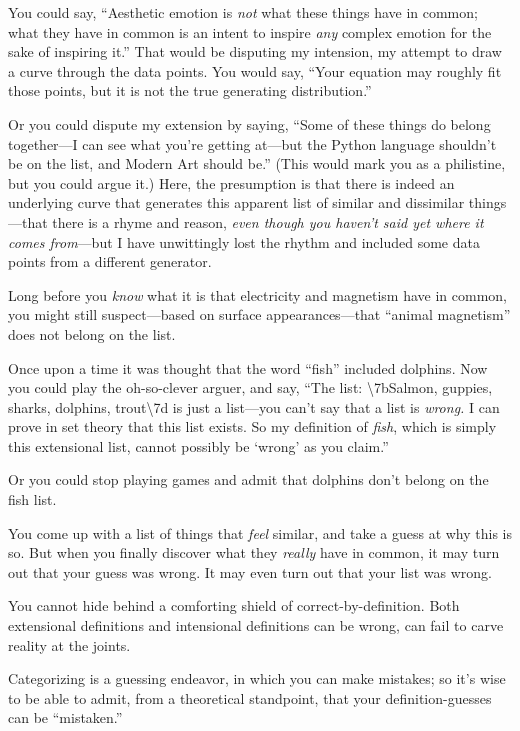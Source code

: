 {
 You could say, ``Aesthetic emotion is
\textit{not} what these things have in common; what they have in common
is an intent to inspire \textit{any} complex emotion for the sake of
inspiring it.'' That would be disputing my intension,
my attempt to draw a curve through the data points. You would say,
``Your equation may roughly fit those points, but it
is not the true generating distribution.''}

{
 Or you could dispute my extension by saying,
``Some of these things do belong together---I can see
what you're getting at---but the Python language
shouldn't be on the list, and Modern Art should
be.'' (This would mark you as a philistine, but you
could argue it.) Here, the presumption is that there is indeed an
underlying curve that generates this apparent list of similar and
dissimilar things---that there is a rhyme and reason, \textit{even
though you haven't said yet where it comes
from}{}---but I have unwittingly lost the rhythm and included some data
points from a different generator.}

{
 Long before you \textit{know} what it is that electricity and
magnetism have in common, you might still suspect---based on surface
appearances---that ``animal
magnetism'' does not belong on the list.}

{
 Once upon a time it was thought that the word
``fish'' included dolphins. Now you
could play the oh-so-clever arguer, and say, ``The
list: {\textbackslash}{\textquotesingle}7bSalmon, guppies, sharks,
dolphins, trout{\textbackslash}{\textquotesingle}7d is just a
list---you can't say that a list is \textit{wrong.} I
can prove in set theory that this list exists. So my definition of
\textit{fish}, which is simply this extensional list, cannot possibly
be `wrong' as you
claim.''}

{
 Or you could stop playing games and admit that dolphins
don't belong on the fish list.}

{
 You come up with a list of things that \textit{feel} similar, and
take a guess at why this is so. But when you finally discover what they
\textit{really} have in common, it may turn out that your guess was
wrong. It may even turn out that your list was wrong.}

{
 You cannot hide behind a comforting shield of
correct-by-definition. Both extensional definitions and intensional
definitions can be wrong, can fail to carve reality at the joints.}

{
 Categorizing is a guessing endeavor, in which you can make
mistakes; so it's wise to be able to admit, from a
theoretical standpoint, that your definition-guesses can be
``mistaken.''}

